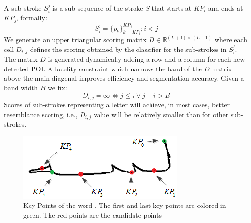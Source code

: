 \documentclass[10pt, conference, compsocconf]{IEEEtran}
\begin{document}
A sub-stroke $S_{i}^{j}$ is a sub-sequence of the stroke $S$ that starts at $KP_{i}$ and ends at $KP_{j}$, formally:
\begin{equation}
S_{i}^{j}=\{p_{k}\}_{k=KP_{i}}^{KP_{j}}; i<j
\end{equation}
We generate an upper triangular scoring matrix $D\in\mathbb{R}^{(L+1)\times (L+1)}$ where each cell $D_{i,j}$ defines the scoring obtained by the classifier for the sub-strokes in $S_i^j$. 
The matrix $D$ is generated dynamically adding a row and a column for each new detected POI. 
A locality constraint which narrows the band of the $D$ matrix above the main diagonal improves efficiency and segmentation accuracy. Given a band width $B$ we fix:
\begin{equation}
D_{i,j}=\infty \Leftrightarrow j \leq i \vee j-i>B 
\end{equation}
Scores of sub-strokes representing a letter will achieve, in most cases, better resemblance scoring, i.e., $D_{i,j}$ value will be relatively smaller than for other sub-strokes.\\

\begin{figure}
\centering
\includegraphics[width=0.7\columnwidth]{./figures/candidate_points}
\caption{Key Points of the word . The first and last key points are colored in green. The red points are the candidate points}
\label{fig:candidate_points}
\end{figure}
\end{document}

